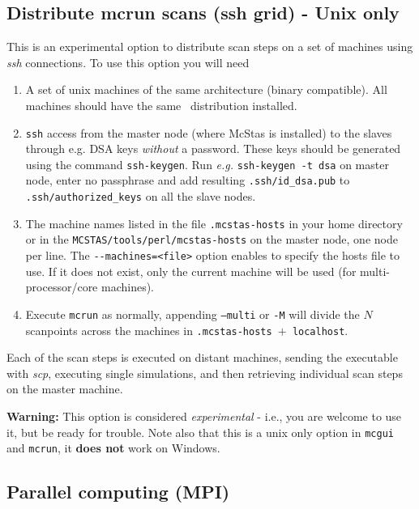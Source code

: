 \subsection{Distribute mcrun scans (ssh grid) - Unix only}
  This is an experimental option to
  distribute scan steps on a set of machines using \emph{ssh}
  connections. To use this option you will need
  \begin{enumerate}
  \item{A set of unix machines of the same architecture (binary compatible). All
      machines should have the same \MCS\ distribution installed.}
  \item{ \texttt{ssh} access from the master node (where McStas is
      installed) to the slaves through e.g. DSA keys \emph{without} a
      password. These keys should be generated using the command
      \texttt{ssh-keygen}. Run \emph{e.g.} \texttt{ssh-keygen -t dsa} on
      master node, enter no passphrase and add resulting
      \texttt{.ssh/id\_dsa.pub} to \texttt{.ssh/authorized\_keys}
      on all the slave nodes.}
  \item{The machine names listed in the file \texttt{.mcstas-hosts} in
      your home directory or in the \texttt{MCSTAS/tools/perl/mcstas-hosts} on
      the master node, one node per line. The \verb'--machines=<file>' option
      enables to specify the hosts file to use. If it does not exist, only the current machine will be used (for multi-processor/core machines).}
  \item{Execute \texttt{mcrun} as normally, appending \texttt{--multi} or
      \texttt{-M} will divide the $N$ scanpoints across the machines in
      \texttt{.mcstas-hosts $+$ localhost}.}
  \end{enumerate}
  Each of the scan steps is executed on distant machines, sending the executable
  with \emph{scp}, executing single simulations, and then retrieving individual
  scan steps on the master machine.

  {\bf Warning:} This option is considered \emph{experimental} - i.e.,
  you are welcome to use it, but be ready for trouble. Note also that
  this is a unix only option in \texttt{mcgui} and \texttt{mcrun}, it
  {\bf does not} work on Windows.

\subsection{Parallel computing (MPI)}

